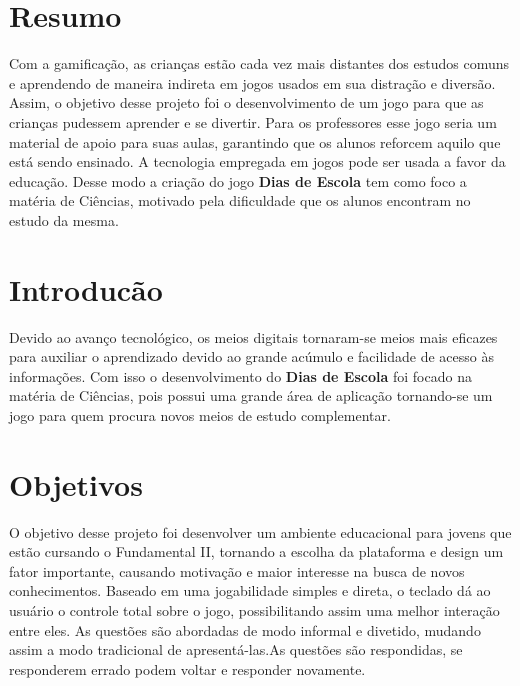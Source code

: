 \documentclass{sciposter}
\begin{document}
\begin{multicols}{2}

\section{Resumo}
 
Com a gamificação, as crianças estão cada vez mais distantes dos estudos comuns e aprendendo de maneira indireta em jogos usados em sua distração e diversão. Assim, o objetivo desse projeto foi o desenvolvimento de um jogo para que as crianças pudessem aprender e se divertir. Para os professores esse jogo seria um material de apoio para suas aulas, garantindo que os alunos reforcem aquilo que está sendo ensinado. A tecnologia empregada em jogos pode ser usada a favor da educação. Desse modo a criação do jogo \textbf{Dias de Escola} tem como foco a matéria de Ciências, motivado pela dificuldade que os alunos encontram no estudo da mesma. 

 

\section{Introducão}
Devido ao avanço tecnológico, os meios digitais tornaram-se meios mais eficazes para auxiliar o aprendizado devido ao grande acúmulo e facilidade de acesso às informações. Com isso o desenvolvimento do \textbf{Dias de Escola} foi focado na matéria de Ciências, pois possui uma grande área de aplicação tornando-se um jogo para quem procura novos meios de estudo complementar.

\newline
\section{Objetivos}

O objetivo desse projeto foi desenvolver um ambiente educacional para jovens que estão cursando o Fundamental II, tornando a escolha da plataforma e design um fator importante, causando motivação e maior interesse na busca de novos conhecimentos.
Baseado em uma jogabilidade simples e direta, o teclado dá ao usuário o controle total sobre o jogo, possibilitando assim uma melhor interação entre eles.
As questões são abordadas de modo informal e divetido, mudando assim a modo tradicional de apresentá-las.As questões são respondidas, se responderem errado podem voltar e responder novamente.


\end{multicols}
\end{document}
